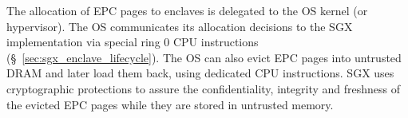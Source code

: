 The allocation of EPC pages to enclaves is delegated to the OS kernel (or
hypervisor). The OS communicates its allocation decisions to the SGX
implementation via special ring 0 CPU instructions
(\S~\ref{sec:sgx_enclave_lifecycle}). The OS can also evict EPC pages into
untrusted DRAM and later load them back, using dedicated CPU instructions. SGX
uses cryptographic protections to assure the confidentiality, integrity and
freshness of the evicted EPC pages while they are stored in untrusted memory.
